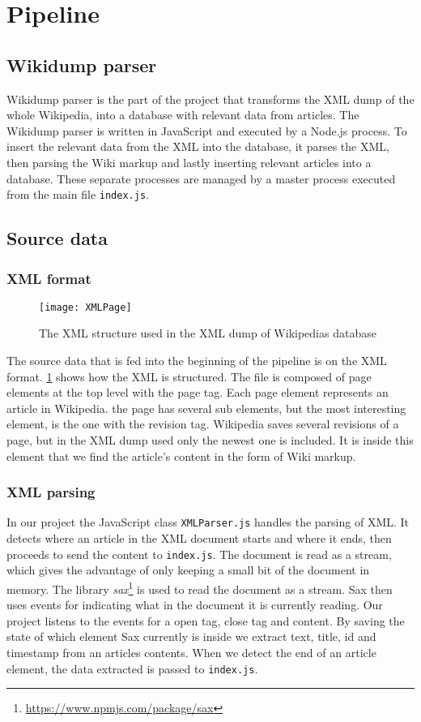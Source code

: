 \section{Pipeline}

\subsection{Wikidump parser}

Wikidump parser is the part of the project that transforms the XML dump of the whole Wikipedia, into a database with relevant data from articles. The Wikidump parser is written in JavaScript and executed by a Node.js process. To insert the relevant data from the XML into the database, it parses the XML, then parsing the Wiki markup and lastly inserting relevant articles into a database. These separate processes are managed by a master process executed from the main file \texttt{index.js}.


\subsection{Source data}


\subsubsection{XML format}
\begin{figure}[h]
\caption{The XML structure used in the XML dump of Wikipedias database}
\texttt{[image: XMLPage]}
\label{fig:xml}
\end{figure}

The source data that is fed into the beginning of the pipeline is on the XML format. \ref{fig:xml} shows how the XML is structured. The file is composed of page elements at the top level with the page tag. Each page element represents an article in Wikipedia. the page has several sub elements, but the most interesting element, is the one with the revision tag. Wikipedia saves several revisions of a page, but in the XML dump used only the newest one is included. It is inside this element that we find the article's content in the form of Wiki markup.


\subsubsection{XML parsing}
In our project the JavaScript class \texttt{XMLParser.js} handles the parsing of XML. It detects where an article in the XML document starts and where it ends, then proceeds to send the content to \texttt{index.js}. The document is read as a stream, which gives the advantage of only keeping a small bit of the document in memory. The library \textit{sax}\footnote{\url{https://www.npmjs.com/package/sax}} is used to read the document as a stream. Sax then uses events for indicating what in the document it is currently reading. Our project listens to the events for a open tag, close tag and content. By saving the state of which element Sax currently is inside we extract text, title, id and timestamp from an articles contents. When we detect the end of an article element, the data extracted is passed to \texttt{index.js}.


